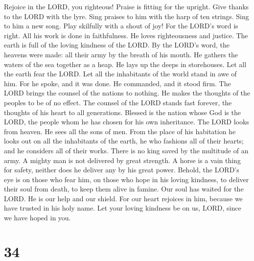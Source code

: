  Rejoice in the LORD, you righteous! Praise is fitting for
the upright.  Give thanks to the LORD with the lyre. Sing
praises to him with the harp of ten strings.  Sing to him a
new song. Play skilfully with a shout of joy!  For the
LORD's word is right. All his work is done in faithfulness. 
He loves righteousness and justice. The earth is full of the loving
kindness of the LORD.  By the LORD's word, the heavens were
made: all their army by the breath of his mouth.  He gathers
the waters of the sea together as a heap. He lays up the deeps in
storehouses.  Let all the earth fear the LORD. Let all the
inhabitants of the world stand in awe of him.  For he spoke,
and it was done. He commanded, and it stood firm.  The LORD
brings the counsel of the nations to nothing. He makes the thoughts of
the peoples to be of no effect.  The counsel of the LORD
stands fast forever, the thoughts of his heart to all generations.
 Blessed is the nation whose God is the LORD, the people
whom he has chosen for his own inheritance.  The LORD looks
from heaven. He sees all the sons of men.  From the place
of his habitation he looks out on all the inhabitants of the earth,
 he who fashions all of their hearts; and he considers all
of their works.  There is no king saved by the multitude of
an army. A mighty man is not delivered by great strength. 
A horse is a vain thing for safety, neither does he deliver any by his
great power.  Behold, the LORD's eye is on those who fear
him, on those who hope in his loving kindness,  to deliver
their soul from death, to keep them alive in famine.  Our
soul has waited for the LORD. He is our help and our shield.
 For our heart rejoices in him, because we have trusted in
his holy name.  Let your loving kindness be on us, LORD,
since we have hoped in you.

\hypertarget{section-33}{%
\section{34}\label{section-33}}

